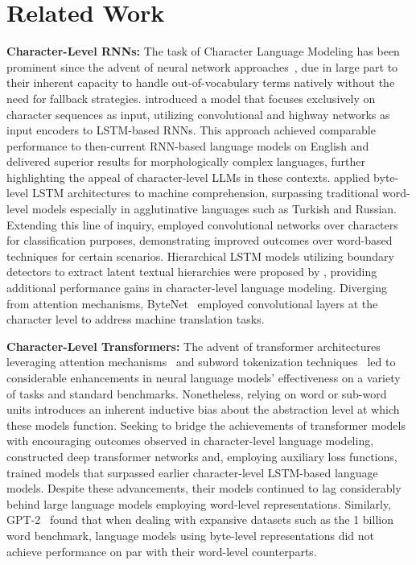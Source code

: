 \section{Related Work}
\label{section:related_work}

\textbf{Character-Level RNNs:} The task of Character Language Modeling has been prominent since the advent of neural network approaches~\citep{sutskever2011generating,mikolov2012subword,graves2013generating}, due in large part to their inherent capacity to handle out-of-vocabulary terms natively without the need for fallback strategies. \cite{kim2016character} introduced a model that focuses exclusively on character sequences as input, utilizing convolutional and highway networks as input encoders to LSTM-based RNNs. This approach achieved comparable performance to then-current RNN-based language models on English and delivered superior results for morphologically complex languages, further highlighting the appeal of character-level LLMs in these contexts. \cite{kenter2018byte} applied byte-level LSTM architectures to machine comprehension, surpassing traditional word-level models especially in agglutinative languages such as Turkish and Russian. Extending this line of inquiry, \cite{zhang2015character} employed convolutional networks over characters for classification purposes, demonstrating improved outcomes over word-based techniques for certain scenarios. Hierarchical LSTM models utilizing boundary detectors to extract latent textual hierarchies were proposed by \citet{chung2019hierarchical}, providing additional performance gains in character-level language modeling. Diverging from attention mechanisms, ByteNet~\citep{kalchbrenner2016neural} employed convolutional layers at the character level to address machine translation tasks.

\textbf{Character-Level Transformers:} The advent of transformer architectures leveraging attention mechanisms~\citep{vaswani2017attention} and subword tokenization techniques~\citep{sennrich-etal-2016-neural} led to considerable enhancements in neural language models' effectiveness on a variety of tasks and standard benchmarks. Nonetheless, relying on word or sub-word units introduces an inherent inductive bias about the abstraction level at which these models function. Seeking to bridge the achievements of transformer models with encouraging outcomes observed in character-level language modeling, \citet{al2019character} constructed deep transformer networks and, employing auxiliary loss functions, trained models that surpassed earlier character-level LSTM-based language models. Despite these advancements, their models continued to lag considerably behind large language models employing word-level representations. Similarly, GPT-2~\citep{radfordgpt2} found that when dealing with expansive datasets such as the 1 billion word benchmark, language models using byte-level representations did not achieve performance on par with their word-level counterparts.

